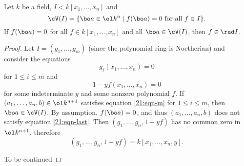 \begin{thm}
  Let $k$ be a field, $I<k[x_1,\ldots,x_n]$ and
  \[ \cV(I) = \{ \bo a \in \ol k^n \mid f(\bo a) = 0 \text{ for all } f \in I \}. \]
  If $f(\bo a)=0$ for all $f \in k[x_1,\ldots,x_n]$ and all $\bo a \in \cV(I)$, then $f \in \rad I$.
\end{thm}

\begin{proof}
  Let $I = (g_1,\ldots,g_m)$ (since the polynomial ring is Noetherian) and consider the equations
  \begin{equation}\label{21:eqn-m}
    g_i(x_1,\ldots,x_n)=0
  \end{equation}
  for $1 \leq i \leq m$ and
  \begin{equation}\label{21:eqn-last}
    1-yf(x_1,\ldots,x_n)=0
  \end{equation}
  for some indeterminate $y$ and some nonzero polynomial $f$.
  If $(a_1,\ldots,a_n,b) \in \ol k^{n+1}$ satisfies equation \ref{21:eqn-m} for $1 \leq i \leq m$, then $\bo a \in \cV(I)$.
  By assumption, $f(\bo a)=0$, and thus $(a_1,\ldots,a_n,b)$ does not satisfy equation \ref{21:eqn-last}.
  Then $(g_1,\ldots,g_n,1-yf)$ has no common zero in $\ol k^{n+1}$, therefore
  \[ (g_1,\ldots,g_n,1-yf) = k[x_1,\ldots,x_n,y]. \]

  To be continued
\end{proof}
